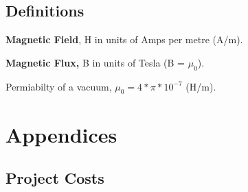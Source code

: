 \documentclass[11pt,a4paper, margin=20mm]{report}
\newcommand{\nocontentsline}[3]{}
\let\origcontentsline\addcontentsline
\newcommand\stoptoc{\let\addcontentsline\nocontentsline}
\newcommand\resumetoc{\let\addcontentsline\origcontentsline}
\begin{document}
\tableofcontents
\listoffigures
\listoftables

\glsaddall
\printglossary[type=\acronymtype,title=Acronyms]

\stoptoc

{\let\clearpage\relax\section*{\textbf{Definitions}}}
\textbf{Magnetic Field}, H in units of Amps per metre (A/m).

\vspace{1em}

\textbf{Magnetic Flux,} B in units of Tesla (B = \(\mu_0\)).

\vspace{1em}

Permiabilty of a vacuum, \(\mu_0=4*\pi*10^{-7}\) (H/m).
\resumetoc
{}
\titlespacing{\chapter}{0pt}{10pt}{10pt}
\setcounter{chapter}{0}













\newcommand{\BIBdecl}{\setlength{\itemsep}{0.25 em}\addcontentsline{toc}{chapter}{Bibliography}}







\appendix
\chapter{Appendices}
\section{Project Costs}
\end{document}
